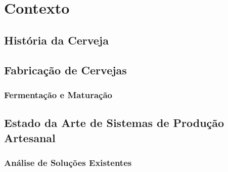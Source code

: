 \chapter{Contexto}

\section{História da Cerveja}

\section{Fabricação de Cervejas}

\subsection{Fermentação e Maturação}

\section{Estado da Arte de Sistemas de Produção Artesanal}

\subsection{Análise de Soluções Existentes}

